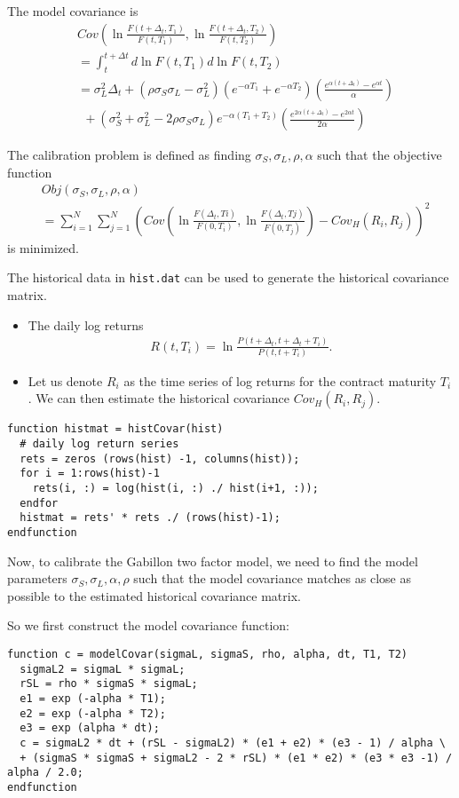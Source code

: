 \documentclass[12pt,a4paper,hidelinks,fleqn]{article}            %
\begin{document}
The model covariance is
\begin{align}
&Cov\left(\ln\frac{F(t+\Delta_t, T_1)}{F(t, T_1)}, \ln\frac{F(t+\Delta_t, T_2)}{F(t, T_2)}\right) \\
&= \int_t^{t+\Delta t} d\ln F(t, T_1) d\ln F(t, T_2) \\
&= \sigma_L^2\Delta_t + (\rho\sigma_S\sigma_L - \sigma_L^2)(e^{-\alpha T_1} + e^{-\alpha T_2})\left(\frac{e^{\alpha(t+\Delta_t)} - e^{\alpha t}}{\alpha}\right) \\
&~~+ (\sigma_S^2+\sigma_L^2 - 2\rho\sigma_S\sigma_L)e^{-\alpha(T_1+T_2)}\left(\frac{e^{2\alpha(t+\Delta_t)} - e^{2\alpha t}}{2\alpha}\right)
\end{align}

The calibration problem is defined as finding $\sigma_S, \sigma_L, \rho, \alpha$ such that the objective function 
\begin{align}
&Obj(\sigma_S, \sigma_L, \rho, \alpha) \\
&= \sum_{i=1}^{N} \sum_{j=1}^{N} \left(Cov\left(\ln\frac{F(\Delta_t, Ti)}{F(0, T_i)}, \ln\frac{F(\Delta_t, Tj)}{F(0, T_j)}\right) - Cov_H (R_i, R_j) \right)^2
\end{align}
is minimized. 

The historical data in \verb=hist.dat= can be used to generate the historical covariance matrix.
\begin{itemize}
\item The daily log returns
\begin{align*}
R(t, T_i) = \ln \frac{P(t+\Delta_t, t+\Delta_t + T_i)}{P(t, t+T_i)}.
\end{align*}
\item Let us denote $R_i$ as the time series of log returns for the contract maturity $T_i$.
We can then estimate the historical covariance $Cov_H (R_i, R_j)$.
\end{itemize}
\begin{verbatim}
function histmat = histCovar(hist)
  # daily log return series
  rets = zeros (rows(hist) -1, columns(hist));
  for i = 1:rows(hist)-1
    rets(i, :) = log(hist(i, :) ./ hist(i+1, :));
  endfor
  histmat = rets' * rets ./ (rows(hist)-1);
endfunction
\end{verbatim}

Now, to calibrate the Gabillon two factor model, we need to find the model parameters $\sigma_S, \sigma_L, \alpha, \rho$
such that the model covariance matches as close as possible to the estimated historical covariance matrix.

So we first construct the model covariance function:
\begin{small}
\begin{verbatim}
function c = modelCovar(sigmaL, sigmaS, rho, alpha, dt, T1, T2)
  sigmaL2 = sigmaL * sigmaL;
  rSL = rho * sigmaS * sigmaL; 
  e1 = exp (-alpha * T1);
  e2 = exp (-alpha * T2);
  e3 = exp (alpha * dt);
  c = sigmaL2 * dt + (rSL - sigmaL2) * (e1 + e2) * (e3 - 1) / alpha \
  + (sigmaS * sigmaS + sigmaL2 - 2 * rSL) * (e1 * e2) * (e3 * e3 -1) / alpha / 2.0;
endfunction
\end{verbatim}
\end{small}
\end{document}
